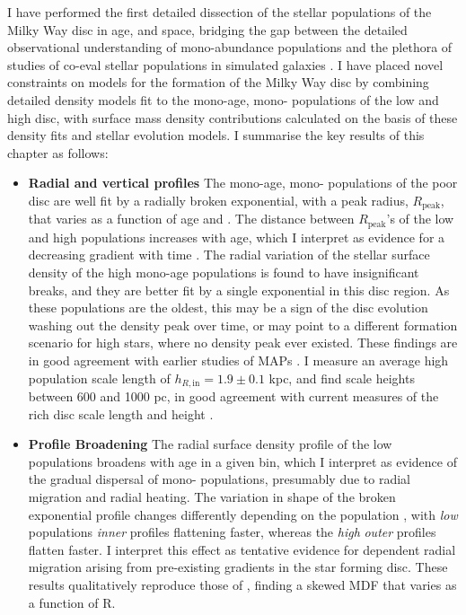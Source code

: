 I have performed the first detailed dissection of the stellar populations of the Milky Way disc in age, \feh{} and \afe{} space, bridging the gap between the detailed observational understanding of mono-abundance populations \citep[e.g.][]{2012ApJ...753..148B,2016ApJ...823...30B} and the plethora of studies of co-eval stellar populations in simulated galaxies \citep[e.g][]{2013ApJ...773...43B,2014MNRAS.442.2474M,2013MNRAS.436..625S}. I have placed novel constraints on models for the formation of the Milky Way disc by combining detailed density models fit to the mono-age, mono-\feh{} populations of the low and high \afe{} disc, with surface mass density contributions calculated on the basis of these density fits and stellar evolution models. I summarise the key results of this chapter as follows:
\begin{itemize}
\item \textbf{Radial and vertical profiles} The mono-age, mono-\feh{} populations of the \afe{} poor disc are well fit by a radially broken exponential, with a peak radius, $R_{\mathrm{peak}}$, that varies as a function of age and \feh{}. The distance between $R_{\mathrm{peak}}$'s of the low and high \feh{} populations increases with age, which I interpret as evidence for a decreasing \feh{} gradient with time \citep[e.g][]{2016arXiv160804951A}. The radial variation of the stellar surface density of the high \afe{} mono-age populations is found to have insignificant breaks, and they are better fit by a single exponential in this disc region. As these populations are the oldest, this may be a sign of the disc evolution washing out the density peak over time, or may point to a different formation scenario for high \afe{} stars, where no density peak ever existed. These findings are in good agreement with earlier studies of MAPs \citep{2016ApJ...823...30B}. I measure an average high \afe{} population scale length of $h_{R,\text{in}} = 1.9 \pm 0.1$ kpc, and find scale heights between 600 and 1000 pc, in good agreement with current measures of the \afe{} rich disc scale length and height \citep[e.g. those outlined in][]{2016ARA&A..54..529B}. 
\item \textbf{Profile Broadening}  The radial surface density profile of the low \afe{} populations broadens with age in a given \feh{} bin, which I interpret as evidence of the gradual dispersal of mono-\feh{} populations, presumably due to radial migration and radial heating. The variation in shape of the broken exponential profile changes differently depending on the population \feh{}, with \emph{low} \feh{} populations \emph{inner} profiles flattening faster, whereas the \emph{high} \feh{} \emph{outer} profiles flatten faster. I interpret this effect as tentative evidence for \feh{} dependent radial migration arising from pre-existing \feh{} gradients in the star forming disc. These results qualitatively reproduce those of \citet{2015ApJ...808..132H}, finding a skewed MDF that varies as a function of R.

\end{itemize}
